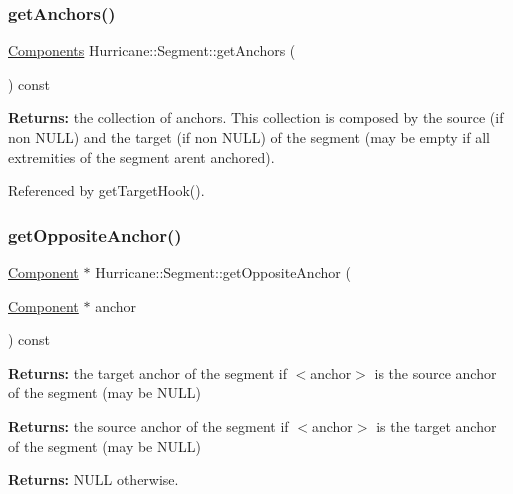 \mbox{\label{classHurricane_1_1Segment_ac179f0263fee7fc71e03c9cf8c2d4e45}} 
\subsubsection{\texorpdfstring{get\+Anchors()}{getAnchors()}}
{\footnotesize\ttfamily \hyperlink{namespaceHurricane_a7d26d99aeb5dd6d70d51bd35d2473e72}{Components} Hurricane\+::\+Segment\+::get\+Anchors (\begin{DoxyParamCaption}{ }\end{DoxyParamCaption}) const}

{\bfseries Returns\+:} the collection of anchors. This collection is composed by the source (if non N\+U\+LL) and the target (if non N\+U\+LL) of the segment (may be empty if all extremities of the segment aren\textquotesingle{}t anchored). 

Referenced by get\+Target\+Hook().

\mbox{\label{classHurricane_1_1Segment_aa425757f271df5c58b024b0494c21588}} 
\subsubsection{\texorpdfstring{get\+Opposite\+Anchor()}{getOppositeAnchor()}}
{\footnotesize\ttfamily \hyperlink{classHurricane_1_1Component}{Component} $\ast$ Hurricane\+::\+Segment\+::get\+Opposite\+Anchor (\begin{DoxyParamCaption}\item[{\hyperlink{classHurricane_1_1Component}{Component} $\ast$}]{anchor }\end{DoxyParamCaption}) const}

{\bfseries Returns\+:} the target anchor of the segment if {\ttfamily $<$anchor$>$} is the source anchor of the segment (may be N\+U\+LL)

{\bfseries Returns\+:} the source anchor of the segment if {\ttfamily $<$anchor$>$} is the target anchor of the segment (may be N\+U\+LL)

{\bfseries Returns\+:} N\+U\+LL otherwise. 

